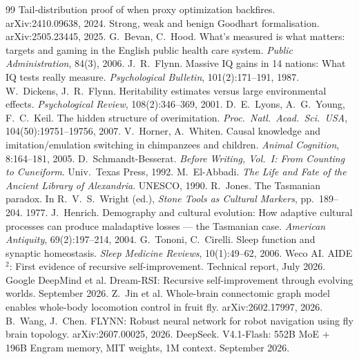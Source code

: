 \documentclass[11pt,openany]{book}
\begin{document}
\begin{thebibliography}{99}
 Tail-distribution proof of when proxy optimization backfires. arXiv:2410.09638, 2024.
 Strong, weak and benign Goodhart formalisation. arXiv:2505.23445, 2025.
 G.\ Bevan, C.\ Hood. What's measured is what matters: targets and gaming in the English public health care system. \textit{Public Administration}, 84(3), 2006.
 J.\ R.\ Flynn. Massive IQ gains in 14 nations: What IQ tests really measure. \textit{Psychological Bulletin}, 101(2):171--191, 1987.
 W.\ Dickens, J.\ R.\ Flynn. Heritability estimates versus large environmental effects. \textit{Psychological Review}, 108(2):346--369, 2001.
 D.\ E.\ Lyons, A.\ G.\ Young, F.\ C.\ Keil. The hidden structure of overimitation. \textit{Proc.\ Natl.\ Acad.\ Sci.\ USA}, 104(50):19751--19756, 2007.
 V.\ Horner, A.\ Whiten. Causal knowledge and imitation/emulation switching in chimpanzees and children. \textit{Animal Cognition}, 8:164--181, 2005.
 D.\ Schmandt-Besserat. \textit{Before Writing, Vol.\ I: From Counting to Cuneiform}. Univ.\ Texas Press, 1992.
 M.\ El-Abbadi. \textit{The Life and Fate of the Ancient Library of Alexandria}. UNESCO, 1990.
 R.\ Jones. The Tasmanian paradox. In R.\ V.\ S.\ Wright (ed.), \textit{Stone Tools as Cultural Markers}, pp.\ 189--204. 1977.
 J.\ Henrich. Demography and cultural evolution: How adaptive cultural processes can produce maladaptive losses --- the Tasmanian case. \textit{American Antiquity}, 69(2):197--214, 2004.
 G.\ Tononi, C.\ Cirelli. Sleep function and synaptic homeostasis. \textit{Sleep Medicine Reviews}, 10(1):49--62, 2006.
 Weco AI. AIDE$^{2}$: First evidence of recursive self-improvement. Technical report, July 2026.
 Google DeepMind et al. Dream-RSI: Recursive self-improvement through evolving worlds. September 2026.
 Z.\ Jin et al. Whole-brain connectomic graph model enables whole-body locomotion control in fruit fly. arXiv:2602.17997, 2026.
 B.\ Wang, J.\ Chen. FLYNN: Robust neural network for robot navigation using fly brain topology. arXiv:2607.00025, 2026.
 DeepSeek. V4.1-Flash: 552B MoE + 196B Engram memory, MIT weights, 1M context. September 2026.

\end{thebibliography}
\end{document}
